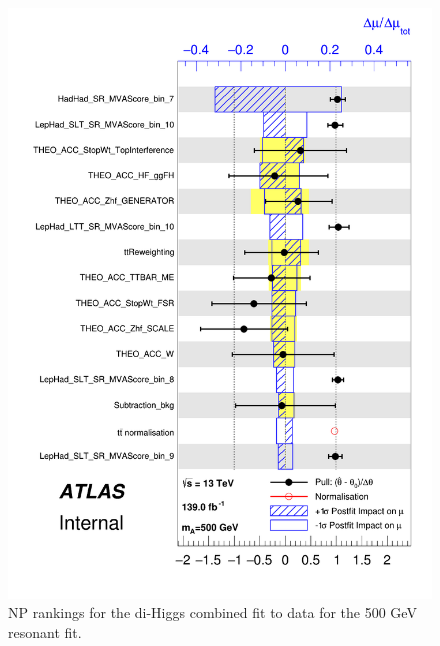 \begin{figure}
\centering
\includegraphics[width=.8\textwidth]{figures/results/HH/Combined/Rankings/rank_500}
\caption{NP rankings for the di-Higgs combined fit to data for the 500 GeV resonant fit.}
\label{fig:CombinedPostfitNPRankings2HDM500}
\end{figure}

